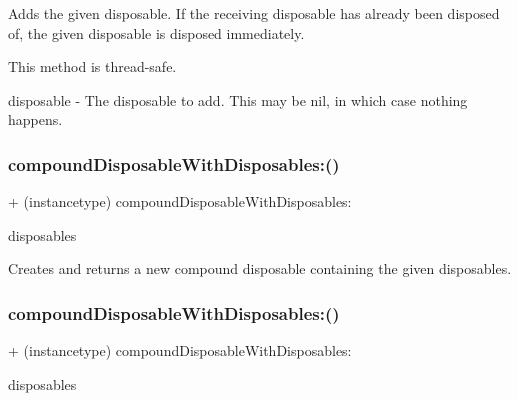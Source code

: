 Adds the given disposable. If the receiving disposable has already been disposed of, the given disposable is disposed immediately.

This method is thread-\/safe.

disposable -\/ The disposable to add. This may be nil, in which case nothing happens. \mbox{\label{interface_r_a_c_compound_disposable_afd4c99dd46b106061bf03ba0652b3b24}} 
\subsubsection{\texorpdfstring{compound\+Disposable\+With\+Disposables\+:()}{compoundDisposableWithDisposables:()}\hspace{0.1cm}{\footnotesize\ttfamily [1/3]}}
{\footnotesize\ttfamily + (instancetype) compound\+Disposable\+With\+Disposables\+: \begin{DoxyParamCaption}\item[{(N\+S\+Array $\ast$)}]{disposables }\end{DoxyParamCaption}}

Creates and returns a new compound disposable containing the given disposables. \mbox{\label{interface_r_a_c_compound_disposable_afd4c99dd46b106061bf03ba0652b3b24}} 
\subsubsection{\texorpdfstring{compound\+Disposable\+With\+Disposables\+:()}{compoundDisposableWithDisposables:()}\hspace{0.1cm}{\footnotesize\ttfamily [2/3]}}
{\footnotesize\ttfamily + (instancetype) compound\+Disposable\+With\+Disposables\+: \begin{DoxyParamCaption}\item[{(N\+S\+Array $\ast$)}]{disposables }\end{DoxyParamCaption}}

